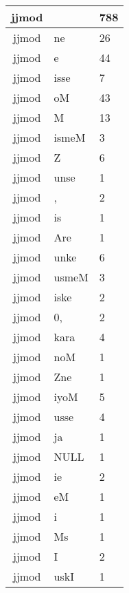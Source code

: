 \documentclass[a4 paper]{article}
\begin{document}
\begin{longtable}{cp{}p{}}
jjmod &  & 788\\ \midrule jjmod & ne & 26\\ \midrule jjmod & e & 44\\ \midrule jjmod & isse & 7\\ \midrule jjmod & oM & 43\\ \midrule jjmod & M & 13\\ \midrule jjmod & ismeM & 3\\ \midrule jjmod & Z & 6\\ \midrule jjmod & unse & 1\\ \midrule jjmod & , & 2\\ \midrule jjmod & is & 1\\ \midrule jjmod & Are & 1\\ \midrule jjmod & unke & 6\\ \midrule jjmod & usmeM & 3\\ \midrule jjmod & iske & 2\\ \midrule jjmod & 0, & 2\\ \midrule jjmod & kara & 4\\ \midrule jjmod & noM & 1\\ \midrule jjmod & Zne & 1\\ \midrule jjmod & iyoM & 5\\ \midrule jjmod & usse & 4\\ \midrule jjmod & ja & 1\\ \midrule jjmod & NULL & 1\\ \midrule jjmod & ie & 2\\ \midrule jjmod & eM & 1\\ \midrule jjmod & i & 1\\ \midrule jjmod & Ms & 1\\ \midrule jjmod & I & 2\\ \midrule jjmod & uskI & 1\\ \midrule 

\end{longtable}
\end{document}
